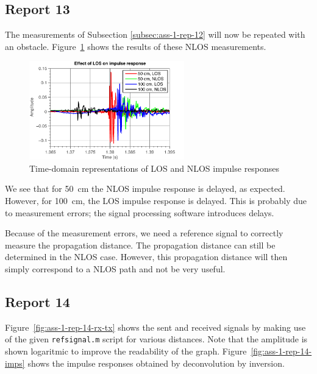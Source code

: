 \documentclass[11pt,titlepage]{report}
\begin{document}
\subsection{Report 13}
\label{subsec:ass-1-rep-13}
The measurements of Subsection \ref{subsec:ass-1-rep-12} will now be repeated with an obstacle. Figure~\ref{fig:ass-1-rep-13-los-nlos} shows the results of these NLOS measurements.

\begin{figure}[H]
	\centering
	\includegraphics[width=0.6\textwidth]{../../deliverable-7-resources/figures/ass-1/report-11-12-13/ass-1-report-13-los-nlos.pdf}
	\caption{Time-domain representations of LOS and NLOS impulse responses}
	\label{fig:ass-1-rep-13-los-nlos}
\end{figure}

We see that for \SI{50}{cm} the NLOS impulse response is delayed, as expected. However, for \SI{100}{cm}, the LOS impulse response is delayed. This is probably due to measurement errors; the signal processing software introduces delays.

Because of the measurement errors, we need a reference signal to correctly measure the propagation distance. The propagation distance can still be determined in the NLOS case. However, this propagation distance will then simply correspond to a NLOS path and not be very useful.



\subsection{Report 14}
Figure~\ref{fig:ass-1-rep-14-rx-tx} shows the sent and received signals by making use of the given \texttt{refsignal.m} script for various distances. Note that the amplitude is shown logaritmic to improve the readability of the graph. Figure~\ref{fig:ass-1-rep-14-imps} shows the impulse responses obtained by deconvolution by inversion.
\end{document}

